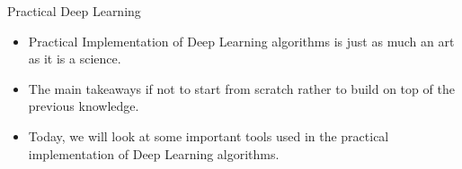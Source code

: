 \begin{frame}{Practical Deep Learning}
\begin{itemize}
    \item Practical Implementation of Deep Learning algorithms is just as much an art as it is a science.
    \item The main takeaways if not to start from scratch rather to build on top of the previous knowledge.
    \item Today, we will look at some important tools used in the practical implementation of Deep Learning algorithms.
\end{itemize}
\end{frame} 